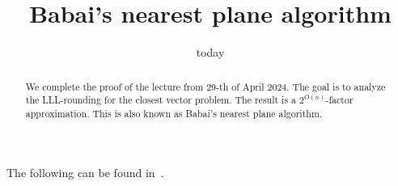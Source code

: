 \documentclass[11pt,a4paper]{article}
\title{Babai's nearest plane algorithm}
\date{ today}
\begin{document}
\maketitle
\begin{abstract}
  We complete the proof of the lecture from 29-th of April 2024. The goal is to analyze the LLL-rounding for the closest vector problem. The result is a $2^{O(n)}$-factor approximation. This is also known as Babai's nearest plane algorithm. 
\end{abstract}


The following can be found in~\cite{babai1986lovasz}. 





 
\end{document}
